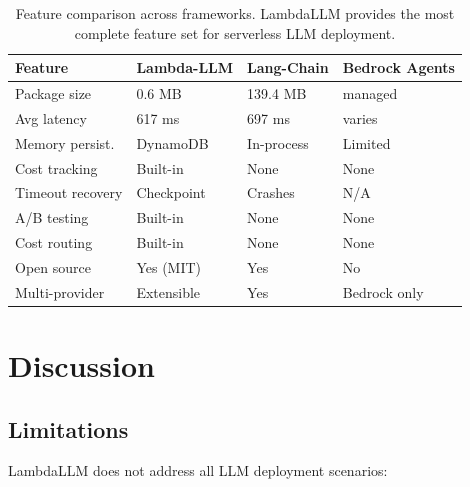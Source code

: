 \documentclass[10pt,twocolumn,letterpaper]{article}
\begin{document}
\begin{table}[h]
\centering
\footnotesize
\caption{Feature comparison across frameworks. LambdaLLM provides the most complete feature set for serverless LLM deployment.}
\label{tab:features}
\setlength{\tabcolsep}{3pt}
\renewcommand{\arraystretch}{1.1}
\begin{tabular}{@{}p{2.1cm}p{1.4cm}p{1.4cm}p{1.6cm}@{}}
\toprule
\textbf{Feature} & \textbf{Lambda-LLM} & \textbf{Lang-Chain} & \textbf{Bedrock Agents} \\
\midrule
Package size       & 0.6 MB       & 139.4 MB        & managed       \\
Avg latency        & 617 ms       & 697 ms          & varies        \\
Memory persist.    & DynamoDB     & In-process      & Limited       \\
Cost tracking      & Built-in     & None            & None          \\
Timeout recovery   & Checkpoint   & Crashes         & N/A           \\
A/B testing        & Built-in     & None            & None          \\
Cost routing       & Built-in     & None            & None          \\
Open source        & Yes (MIT)    & Yes             & No            \\
Multi-provider     & Extensible   & Yes             & Bedrock only  \\
\bottomrule
\end{tabular}
\end{table}

\section{Discussion}

\subsection{Limitations}

LambdaLLM does not address all LLM deployment scenarios:
\end{document}

